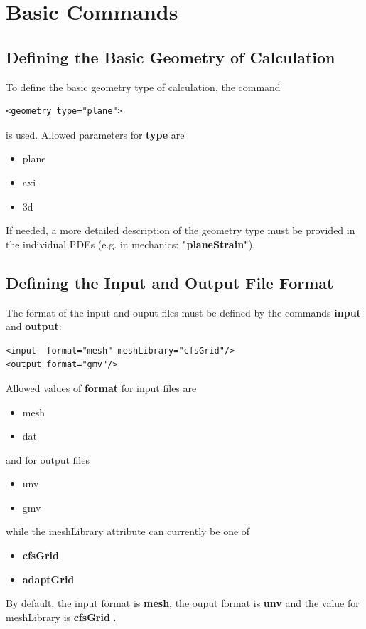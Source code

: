 \chapter{Basic Commands}
\section{Defining the Basic Geometry of Calculation}
To define the basic geometry type of calculation, the command
\begin{verbatim} 
<geometry type="plane">
\end{verbatim} 
is used. Allowed parameters for {\bf type} are
{\bf 
\begin{itemize}
\item plane
\item axi
\item 3d
\end{itemize}}

If needed, a more detailed description of the geometry type must be
provided in the individual PDEs (e.g. in mechanics: {\bf "planeStrain"}).



\section{Defining the Input and Output File Format}
The format of the input and ouput files must be defined by the
commands {\bf input} and {\bf output}:

\begin{verbatim} 
<input  format="mesh" meshLibrary="cfsGrid"/>
<output format="gmv"/>
\end{verbatim} 

Allowed values of {\bf format} for input files are
{\bf \begin{itemize}
\item mesh
\item dat
\end{itemize}}
and for output files
{\bf \begin{itemize}
\item unv
\item gmv
\end{itemize}}
while the meshLibrary attribute can currently be one of
\begin{itemize}
\item \textbf{cfsGrid }
\item \textbf{adaptGrid}
\end{itemize}
\noindent
By default, the input format is \textbf{mesh}, the ouput format is \textbf{unv}
and the value for meshLibrary is \textbf{cfsGrid }.

